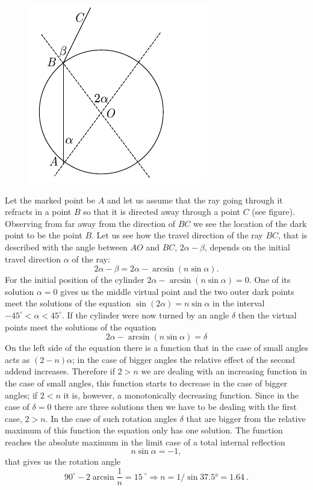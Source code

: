 \solueng
\begin{figure}%
\includegraphics[trim = 0mm 0mm 12mm 0mm, clip, width=1\linewidth]{2014-v3g-10-silinder}
\end{figure}
Let the marked point be $A$ and let us assume that the ray going through it refracts in a point $B$ so that it is directed away through a point $C$ (see figure). Observing from far away from the direction of $BC$ we see the location of the dark point to be the point $B$. Let us see how the travel direction of the ray $BC$, that is described with the angle between $AO$ and $BC$, $2\alpha-\beta$, depends on the initial travel direction $\alpha$ of the ray:
$$2\alpha-\beta= 2\alpha-\arcsin (n\sin\alpha).$$
For the initial position of the cylinder $2\alpha-\arcsin (n\sin\alpha) =0$. One of its solution $\alpha=0$ gives us the middle virtual point and the two outer dark points meet the solutions of the equation $\sin(2\alpha)=n\sin\alpha$ in the interval $-45^\circ <\alpha<45^\circ$. If the cylinder were now turned by an angle $\delta$ then the virtual points meet the solutions of the equation
$$2\alpha-\arcsin (n\sin\alpha) =\delta$$
On the left side of the equation there is a function that in the case of small angles acts as $(2-n)\alpha$; in the case of bigger angles the relative effect of the second addend increases. Therefore if $2>n$ we are dealing with an increasing function in the case of small angles, this function starts to decrease in the case of bigger angles; if $2<n$ it is, however, a monotonically decreasing function. Since in the case of $\delta=0$ there are three solutions then we have to be dealing with the first case, $2>n$. In the case of such rotation angles $\delta$ that are bigger from the relative maximum of this function the equation only has one solution. The function reaches the absolute maximum in the limit case of a total internal reflection
$$n\sin\alpha=-1,$$
that gives us the rotation angle 
$$90^\circ-2\arcsin \frac 1n=\SI{15}{}^\circ\Rightarrow n=1/\sin \ang{37,5} = \SI{1,64}{}.$$
\probend